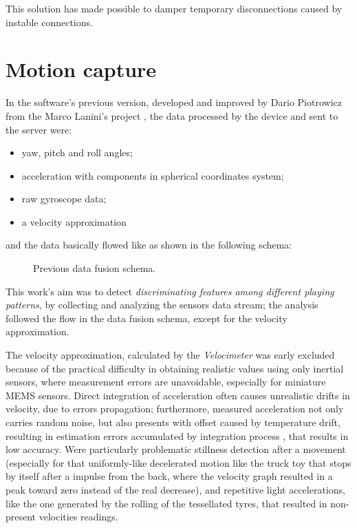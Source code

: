 This solution has made possible to damper temporary disconnections caused by instable connections.

\section{Motion capture}
In the software's previous version, developed and improved by Dario Piotrowicz \cite{Pio19} from the Marco Lanini's project \cite{Lan17}, the data processed by the device and sent to the server were:
\begin{itemize}
	\item yaw, pitch and roll angles;
	\item acceleration with components in spherical coordinates system;
	\item raw gyroscope data;
	\item a velocity approximation
\end{itemize}
and the data basically flowed like as shown in the following schema:
\bigbreak

\begin{center}
	\begin{figure}[ht!]
		\caption{Previous data fusion schema.}
	\end{figure}
\end{center}
\bigbreak

This work's aim was to detect \textit{discriminating features among different playing patterns}, by collecting and analyzing the sensors data stream; the analysis followed the flow in the data fusion schema, except for the velocity approximation.
\bigbreak

The velocity approximation, calculated by the \textit{Velocimeter} \cite{Pio19} was early excluded because of the practical difficulty in obtaining realistic values using only inertial sensors, where measurement errors are unavoidable, especially for miniature MEMS sensors. Direct integration of acceleration often causes unrealistic drifts in velocity, due to errors propagation; furthermore, measured acceleration not only carries random noise, but also presents with offset caused by temperature drift, resulting in estimation errors accumulated by integration process \cite{Du15, Est14, Kow15, Liu01, Sei07, UsingAcc, Woo07, Yan06}, that results in low accuracy. Were particularly problematic stillness detection after a movement (especially for that uniformly-like decelerated motion like the truck toy that stops by itself after a impulse from the back, where the velocity graph resulted in a peak toward zero instead of the real decrease), and repetitive light accelerations, like the one generated by the rolling of the tessellated tyres, that resulted in non-present velocities readings.
\bigbreak

